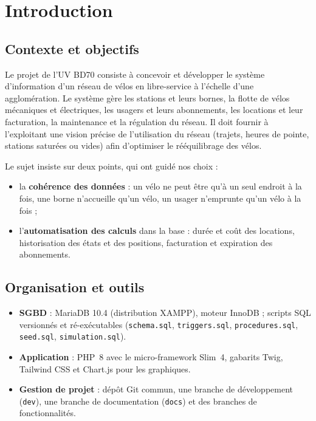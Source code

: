 \section{Introduction}

\subsection{Contexte et objectifs}

Le projet de l'UV BD70 consiste à concevoir et développer le système d'information d'un réseau de vélos en libre-service à l'échelle d'une agglomération. Le système gère les stations et leurs bornes, la flotte de vélos mécaniques et électriques, les usagers et leurs abonnements, les locations et leur facturation, la maintenance et la régulation du réseau. Il doit fournir à l'exploitant une vision précise de l'utilisation du réseau (trajets, heures de pointe, stations saturées ou vides) afin d'optimiser le rééquilibrage des vélos.

Le sujet insiste sur deux points, qui ont guidé nos choix :
\begin{itemize}
	\item la \textbf{cohérence des données} : un vélo ne peut être qu'à un seul endroit à la fois, une borne n'accueille qu'un vélo, un usager n'emprunte qu'un vélo à la fois ;
	\item l'\textbf{automatisation des calculs} dans la base : durée et coût des locations, historisation des états et des positions, facturation et expiration des abonnements.
\end{itemize}

\subsection{Organisation et outils}

\begin{itemize}
	\item \textbf{SGBD} : MariaDB 10.4 (distribution XAMPP), moteur InnoDB ; scripts SQL versionnés et ré-exécutables (\texttt{schema.sql}, \texttt{triggers.sql}, \texttt{procedures.sql}, \texttt{seed.sql}, \texttt{simulation.sql}).
	\item \textbf{Application} : PHP~8 avec le micro-framework Slim~4, gabarits Twig, Tailwind CSS et Chart.js pour les graphiques.
	\item \textbf{Gestion de projet} : dépôt Git commun, une branche de développement (\texttt{dev}), une branche de documentation (\texttt{docs}) et des branches de fonctionnalités.
\end{itemize}

